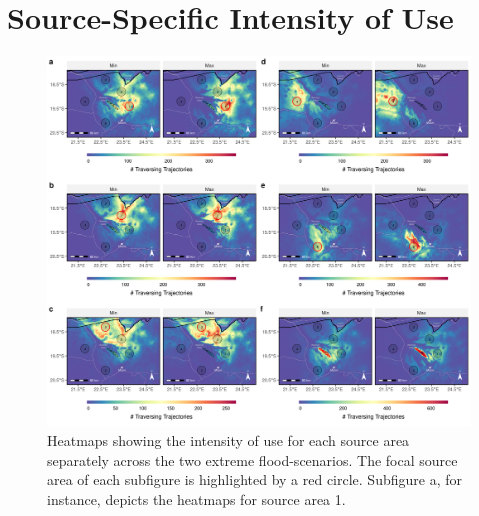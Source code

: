 \documentclass[../FinalThesis.tex]{subfiles}
\begin{document}
\section{Source-Specific Intensity of Use}
\begin{figure}[!ht]
  \begin{center}
  \includegraphics[width = \textwidth]{Figures/HeatmapsIndividual.png}
  \caption{Heatmaps showing the intensity of use for each source area separately
  across the two extreme flood-scenarios. The focal source area of each
  subfigure is highlighted by a red circle. Subfigure a, for instance, depicts
  the heatmaps for source area 1.}
  \label{HeatmapsInd}
  \end{center}
\end{figure}

\newpage
\end{document}
